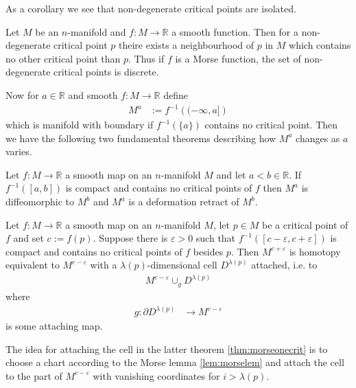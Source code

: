 As a corollary we see that non-degenerate critical points are isolated.
\\
\begin{cor}
\label{cor:ndcrisol}
Let $M$ be an $n$-manifold and $f \colon M \to \mathbb{R}$ a smooth function. Then for a non-degenerate critical point $p$ theire exists a neighbourhood of $p$ in $M$ which contains no other critical point than $p$. Thus if $f$ is a Morse function, the set of non-degenerate critical points is discrete.
\end{cor}
Now for $a \in \mathbb{R}$ and smooth $f \colon M \to \mathbb{R}$ define
\begin{align*}
  M^{a}
  &:=
  f^{-1}
  \left(
    (-\infty,a]
  \right)
\end{align*}
which is manifold with boundary if $f^{-1}(\lbrace a \rbrace)$ contains no critical point. Then we have the following two fundamental theorems describing how $M^{a}$ changes as $a$ varies.
\\
\begin{thm}
\label{thm:morsenocrit}
Let $f \colon M \to \mathbb{R}$ a smooth map on an $n$-manifold $M$ and let $a < b \in \mathbb{R}$. If $f^{-1}([a,b])$ is compact and contains no critical points of $f$ then $M^{a}$ is diffeomorphic to $M^{b}$ and $M^{a}$ is a deformation retract of $M^{b}$.
\end{thm}
\begin{thm}
\label{thm:morseonecrit}
Let $f \colon M \to \mathbb{R}$ a smooth map on an $n$-manifold $M$, let $p \in M$ be a critical point of $f$ and set $c := f(p)$. Suppose there is $\varepsilon > 0$ such that $f^{-1}([c-\varepsilon,c+\varepsilon])$ is compact and contains no critical points of $f$ besides $p$. Then $M^{c+\varepsilon}$ is homotopy equivalent to $M^{c-\varepsilon}$ with a $\lambda(p)$-dimensional cell $D^{\lambda(p)}$ attached, i.e. to
\begin{align*}
  M^{c-\varepsilon}
  \cup_{g}
  D^{\lambda(p)}
\end{align*}
where
\begin{align*}
  g
  \colon
  \partial
  D^{\lambda(p)}
  &\to
  M^{c-\varepsilon}
\end{align*}
is some attaching map.
\end{thm}
The idea for attaching the cell in the latter theorem \ref{thm:morseonecrit} is to choose a chart according to the Morse lemma \ref{lem:morselem} and attach the cell to the part of $M^{c-\varepsilon}$ with vanishing coordinates for $i > \lambda(p)$.
\\
